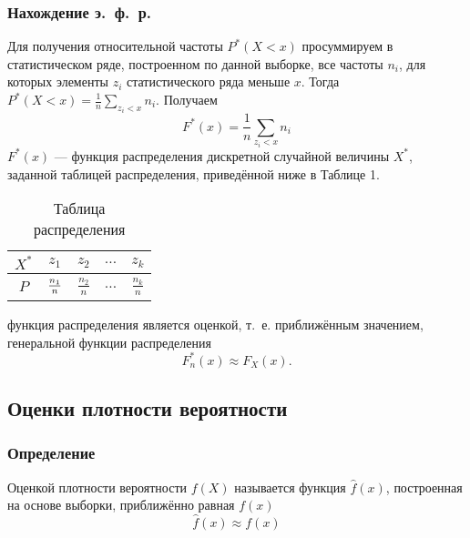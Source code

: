 \documentclass[12pt]{article}
\begin{document}
\subsubsection{Нахождение э.~ф.~р.}
Для получения относительной частоты $P^*(X < x)$ просуммируем в статистическом ряде, построенном по данной выборке, все частоты $n_i$, для которых элементы $z_i$ статистического ряда меньше $x$. Тогда $P^*(X < x) = \frac{1}{n}\sum\limits_{z_i < x}n_i$. Получаем
\[
	F^*(x) = \frac{1}{n}\sum_{z_i < x}n_i
\]
$F^*(x)$ --- функция распределения дискретной случайной величины $X^*$, заданной таблицей распределения, приведённой ниже в Таблице 1.
\begin{table}[h!]
    \caption{Таблица распределения}
    \begin{center}
    \begin{tabular}{|c|c|c|c|c|}
    \hline
    $X^*$&$z_1$&$z_2$&$\dots$&$z_k$\\
    \hline
	$P$&$\frac{n_1\mathstrut}{n\mathstrut}$&$\frac{n_2}{n}$&$\dots$&$\frac{n_k}{n}$\\
    \hline
    \end{tabular}
\end{center}
\end{table}

 функция распределения является оценкой, т.~е. приближённым значением, генеральной функции распределения
\begin{equation}
	F_n^*(x) \approx F_X(x).
	\label{empiric}
\end{equation}
\subsection{Оценки плотности вероятности}
\subsubsection{Определение}
Оценкой плотности вероятности $f(X)$ называется функция $\hat f(x)$, построенная на основе выборки, приближённо равная $f(x)$
\[
	\hat f(x) \approx f(x)
\]
\end{document}
